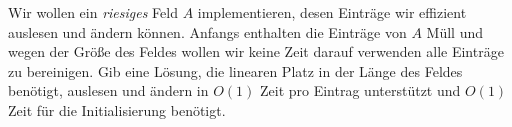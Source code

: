 \documentclass{uebung_cs}
\begin{document}
\begin{aufgabe}
	Wir wollen ein \textit{riesiges} Feld $A$ implementieren, desen Einträge wir effizient auslesen und ändern können.
	Anfangs enthalten die Einträge von $A$ \glqq Müll\grqq{} und wegen der Größe des Feldes wollen wir keine Zeit darauf verwenden alle Einträge zu bereinigen.
	Gib eine Lösung, die linearen Platz in der Länge des Feldes benötigt, auslesen und ändern in $O(1)$ Zeit pro Eintrag unterstützt und $O(1)$ Zeit für die Initialisierung benötigt.
\end{aufgabe}
\end{document}
